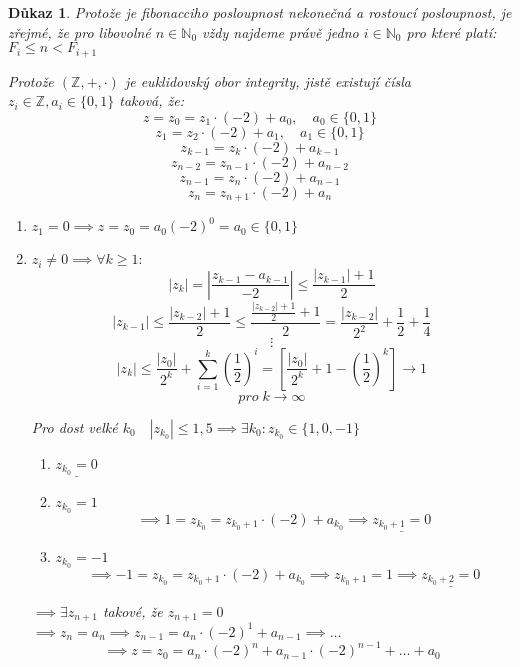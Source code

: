 \documentclass[12pt]{book}
\newtheorem*{dukaz}{Důkaz}
\begin{document}
\begin{dukaz}\label{fiboDF}
	Protože je fibonacciho posloupnost nekonečná a rostoucí posloupnost, je zřejmé, že pro libovolné $n\in\mathbb{N}_0$ vždy najdeme právě jedno $i\in\mathbb{N}_0$ pro které platí: $F_i\le n<F_{i+1}$
	
	Protože $(\mathbb{Z},+,\cdot)$ je euklidovský obor integrity, jistě existují čísla $z_i\in\mathbb{Z}, a_i\in\{0,1\}$ taková, že:
	$$ z=z_0=z_1\cdot(-2)+a_0,\quad a_0\in\{0,1\}$$
	$$ z_1=z_2\cdot(-2)+a_1,\quad a_1\in\{0,1\}$$
	$$ z_{k-1}=z_k\cdot(-2)+a_{k-1}$$
	$$ z_{n-2}=z_{n-1}\cdot(-2)+a_{n-2}$$
	$$ z_{n-1}=z_n\cdot(-2)+a_{n-1}$$
	$$ z_n=z_{n+1}\cdot(-2)+a_n$$
	\begin{enumerate}
		\item[$\alpha)$] $z_1=0 \implies z=z_0=a_0(-2)^0=a_0\in\{0,1\}$
		\item[$\beta)$]  $z_i \ne 0 \implies \forall k \ge 1:$
		$$|z_k|=\left|\frac{z_{k-1}-a_{k-1}}{-2}\right|\le \frac{|z_{k-1}|+1}{2}$$
		$$|z_{k-1}|\le\frac{|z_{k-2}|+1}{2}\le\frac{\frac{|z_{k-2}|+1}{2}+1}{2}=\frac{|z_{k-2}|}{2^2}+\frac{1}{2}+\frac{1}{4}$$
		$$\vdots$$
		$$|z_k|\le\frac{|z_0|}{2^k}+\sum_{i=1}^{k}\left(\frac{1}{2}\right)^i=\left[\frac{|z_0|}{2^k}+1-\left(\frac{1}{2}\right)^k \right]\to 1 $$
		$$ pro\; k \to \infty $$
		
		Pro dost velké $k_0 \quad |z_{k_0}|\le1,5 \implies \exists k_0:z_{k_0}\in\{1,0,-1\}$
		\begin{enumerate}
			\item[a)] $\underline{z_{k_0}=0}$
			\item[b)]$z_{k_0}=1$
			$$\implies 1=z_{k_0}=z_{k_0+1}\cdot(-2)+a_{k_0}\implies \underline{z_{k_0+1}=0}$$
			\item[c)]$z_{k_0}=-1$
			$$\implies -1=z_{k_0}=z_{k_0+1}\cdot(-2)+a_{k_0}\implies z_{k_0+1}=1\implies \underline{z_{k_0+2}=0}$$ 
		\end{enumerate}
		$\implies \exists z_{n+1}$ takové, že $z_{n+1}=0$\newline
		$\implies z_n = a_n \implies z_{n-1}=a_n\cdot(-2)^1+a_{n-1}\implies \dots$
		$$\implies z=z_0=a_n\cdot(-2)^n+a_{n-1}\cdot(-2)^{n-1}+\dots+a_0$$
	\end{enumerate}
\end{dukaz}
\end{document}
